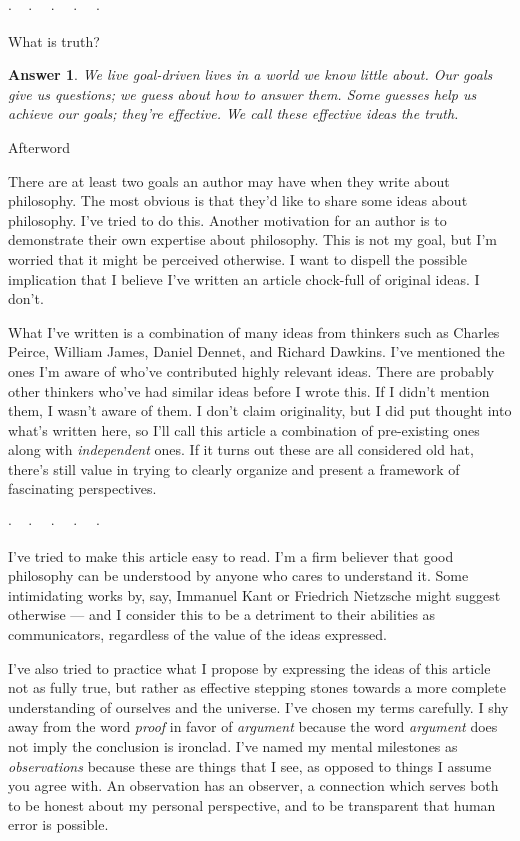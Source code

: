 \documentclass[11pt, oneside]{article}
\newtheorem*{answer}{Answer}
\theoremstyle{argtstyle}
\newcommand{\dotq}{\cdot\quad}
\newcommand{\scenebreak}{
    \medskip\centerline{$\dotq\dotq\dotq\dotq\cdot$}\medskip
}
\begin{document}
\scenebreak

What is truth?
\begin{answer}{}
    We live goal-driven lives in a world we know little about.
    Our goals give us questions; we guess about how to answer them.
    Some guesses help us achieve our goals; they're effective.
    We call these effective ideas the {\em truth}.
\end{answer}

\pagebreak

{\huge Afterword}
\bigskip

There are at least two goals an author may have when they write about
philosophy.
The most obvious is that they'd like to share some ideas about philosophy.
I've tried to do this.
Another motivation for an author is to demonstrate their own expertise about
philosophy.
This is not my goal, but I'm worried that it might be perceived otherwise.
I want to dispell the possible implication that I believe I've written an
article chock-full of original ideas. I don't.

What I've written is a combination of many ideas from thinkers such as Charles
Peirce, William James, Daniel Dennet, and Richard Dawkins.
I've mentioned the ones I'm aware of who've contributed highly relevant ideas.
There are probably other thinkers who've had similar ideas before I wrote
this. If I didn't mention them, I wasn't aware of them.
I don't claim
originality, but I did put thought into what's written here, so I'll call this
article a combination of pre-existing ones along with {\em independent} ones.
If it turns out these are all considered old hat, there's still value in
trying to clearly organize and present a framework of fascinating perspectives.

\scenebreak

I've tried to make this article easy to read.
I'm a firm believer that
good philosophy can be understood by anyone who cares to understand it.
Some intimidating works by, say, Immanuel Kant or Friedrich Nietzsche might
suggest otherwise ---
and I consider this to be a detriment to their abilities as
communicators, regardless of the value of the ideas expressed.

I've also tried to practice what I propose by expressing the ideas of this
article not as fully true,
but rather as effective stepping stones towards
a more complete understanding of ourselves and the universe. I've chosen my
terms carefully. I shy away from the word {\em proof} in favor of {\em argument}
because the word {\em argument} does not imply the conclusion is ironclad.
I've named my mental milestones as {\em observations} because these are things
that I see, as opposed to things I assume you agree with.
An observation has an observer,
a connection which serves both to be honest about my personal perspective,
and to be transparent that human error is possible.
\end{document}
